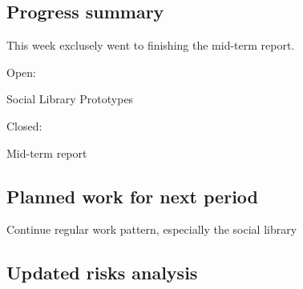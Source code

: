 

\subsection{Progress summary}
This week exclusely went to finishing the mid-term report.


Open:

Social Library
Prototypes

Closed:

Mid-term report


\subsection{Planned work for next period}
Continue regular work pattern, especially the social library

\subsection{Updated risks analysis}


